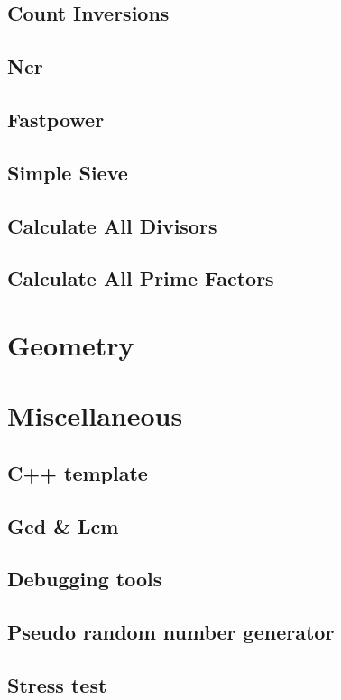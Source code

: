\subsection{Count Inversions}
\raggedbottom
\hrulefill
\subsection{Ncr}
\raggedbottom
\hrulefill
\subsection{Fastpower}
\raggedbottom
\hrulefill
\subsection{Simple Sieve}
\raggedbottom
\hrulefill
\subsection{Calculate All Divisors}
\raggedbottom
\hrulefill
\subsection{Calculate All Prime Factors}
\raggedbottom
\hrulefill

\section{Geometry}

\section{Miscellaneous}
\subsection{C++ template}
\raggedbottom
\hrulefill
\subsection{Gcd \& Lcm}
\raggedbottom
\hrulefill
\subsection{Debugging tools}
\raggedbottom
\hrulefill
\subsection{Pseudo random number generator}
\raggedbottom
\hrulefill
\subsection{Stress test}
\raggedbottom
\hrulefill

